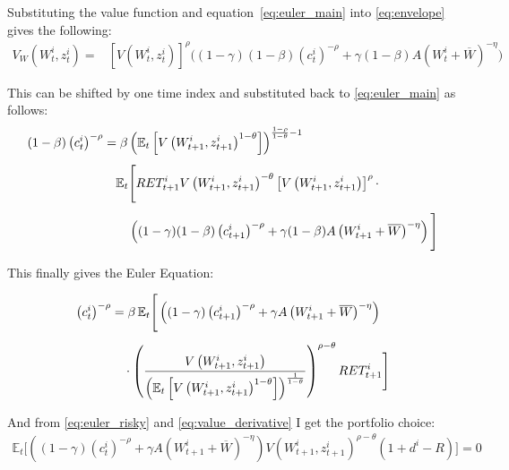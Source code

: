 \documentclass[12pt]{article}
\begin{document}
Substituting the value function and equation~\eqref{eq:euler_main} into \eqref{eq:envelope} gives the following:
\begin{align}
V_W\left(W_t^i, z_t^i\right) = 
&\left[ V\left(W_t^i, z_t^i\right) \right]^{\rho} \Bigg(
    (1 - \gamma) (1 - \beta) \left(c_t^i\right)^{-\rho} 
 + \gamma (1 - \beta) A\left(W_t^i + \overline{W} \right)^{-\eta}
\Bigg) \label{eq:value_derivative}
\end{align}

This can be shifted by one time index and substituted back to \eqref{eq:euler_main} as follows:
\begin{align}
(1 - \beta) \left(c_t^i\right)^{-\rho} 
&= \beta 
\left( 
    \mathbb{E}_t \left[ V\left(W_{t+1}^i, z_{t+1}^i\right)^{1 - \theta} \right] 
\right)^{\frac{1 - \rho}{1 - \theta} - 1} \notag \\[1ex]
&\quad \mathbb{E}_t \Bigg[ 
     RET_{t+1}^i V\left(W_{t+1}^i, z_{t+1}^i\right)^{-\theta} 
    \left[ V\left(W_{t+1}^i, z_{t+1}^i\right) \right]^{\rho} 
   \cdot \notag \\[1ex]
&\qquad \left( 
        (1 - \gamma)(1 - \beta) \left(c_{t+1}^i\right)^{-\rho} 
        + \gamma (1 - \beta) A\left(W_{t+1}^i + \overline{W} \right)^{-\eta}
    \right)
\Bigg]
\end{align}

This finally gives the Euler Equation:

\begin{align}
\left(c_t^i\right)^{-\rho} 
&= \beta \, \mathbb{E}_t \Bigg[
    \left( 
        (1 - \gamma) \left(c_{t+1}^i\right)^{-\rho} 
        + \gamma A\left(W_{t+1}^i + \overline{W} \right)^{-\eta} 
    \right) \notag \\[1ex]
&\quad \cdot 
    \left(
        \frac{
            V\left(W_{t+1}^i, z_{t+1}^i\right)
        }{
            \left( \mathbb{E}_t \left[ V\left(W_{t+1}^i, z_{t+1}^i\right)^{1 - \theta} \right] \right)^{\frac{1}{1 - \theta}}
        }
    \right)^{\rho - \theta}
    RET_{t+1}^i
\Bigg]
\end{align}

And from \eqref{eq:euler_risky} and \eqref{eq:value_derivative} I get the portfolio choice:
\begin{align}
\mathbb{E}_t \Bigg[
    \left( 
        (1 - \gamma) \left(c_t^i\right)^{-\rho} 
        + \gamma A\left(W_{t+1}^i + \overline{W} \right)^{-\eta} 
    \right)
    V\left(W_{t+1}^i, z_{t+1}^i\right)^{\rho - \theta}
    \left(1 + d^i - R \right)
\Bigg] = 0 \label{eq:ret_cond}
\end{align}
\end{document}
